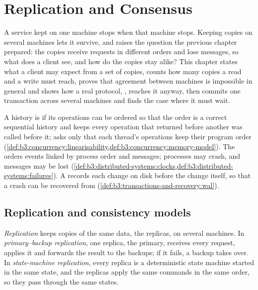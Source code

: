 \chapter{Replication and Consensus}\label{ch:b3:replication-and-consensus}

A service kept on one machine stops when that machine stops. Keeping copies on several machines lets it survive, and raises the question the previous chapter prepared: the copies receive requests in different orders and lose messages, so what does a client see, and how do the copies stay alike? This chapter states what a client may expect from a set of copies, counts how many copies a read and a write must reach, proves that agreement between machines is impossible in general and shows how a real protocol, , reaches it anyway, then commits one transaction across several machines and finds the case where it must wait.

\begin{recall}
A history is  if its operations can be ordered so that the order is a correct sequential history and keeps every operation that returned before another was called before it;  asks only that each thread's operations keep their program order (\cref{def:b3:concurrency:linearisability,def:b3:concurrency:memory-model}). The  orders events linked by process order and messages; processes may crash, and messages may be lost (\cref{def:b3:distributed-systems:clocks,def:b3:distributed-systems:failures}). A  records each change on disk before the change itself, so that a crash can be recovered from (\cref{def:b3:transactions-and-recovery:wal}).
\end{recall}

\section{Replication and consistency models}\label{sec:b3:replication-and-consensus:consistency}

\begin{definition}\label{def:b3:replication-and-consensus:replication}
\emph{Replication} keeps copies of the same data, the replicas, on several machines. In \emph{primary--backup replication}, one replica, the primary, receives every request, applies it and forwards the result to the backups; if it fails, a backup takes over. In \emph{state-machine replication}, every replica is a deterministic state machine started in the same state, and the replicas apply the same commands in the same order, so they pass through the same states.
\end{definition}

